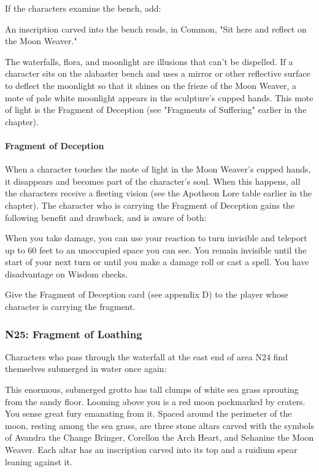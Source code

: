 \documentclass[10pt,a4,twoside,twocolumn,openany,nodeprecatedcode]{dndbook}
\begin{document}
If the characters examine the bench, add:
\begin{DndReadAloud}{}
An inscription carved into the bench reads, in Common, "Sit here and reflect on the Moon Weaver."
\end{DndReadAloud}

The waterfalls, flora, and moonlight are illusions that can't be dispelled. If a character sits on the alabaster bench and uses a mirror or other reflective surface to deflect the moonlight so that it shines on the frieze of the Moon Weaver, a mote of pale white moonlight appears in the sculpture's cupped hands. This mote of light is the Fragment of Deception (see "Fragments of Suffering" earlier in the chapter).
\paragraph{Fragment of Deception}
When a character touches the mote of light in the Moon Weaver's cupped hands, it disappears and becomes part of the character's soul. When this happens, all the characters receive a fleeting vision (see the Apotheon Lore table earlier in the chapter).
The character who is carrying the Fragment of Deception gains the following benefit and drawback, and is aware of both:
\begin{DndComment}{}
{{When you take damage, you can use your reaction to turn invisible and teleport up to 60 feet to an unoccupied space you can see. You remain invisible until the start of your next turn or until you make a damage roll or cast a spell.}}
{{You have disadvantage on Wisdom checks.}}
\end{DndComment}

Give the Fragment of Deception card (see appendix D) to the player whose character is carrying the fragment.
\subsubsection{N25: Fragment of Loathing}
Characters who pass through the waterfall at the east end of area N24 find themselves submerged in water once again:
\begin{DndReadAloud}{}
This enormous, submerged grotto has tall clumps of white sea grass sprouting from the sandy floor. Looming above you is a red moon pockmarked by craters. You sense great fury emanating from it.
Spaced around the perimeter of the moon, resting among the sea grass, are three stone altars carved with the symbols of Avandra the Change Bringer, Corellon the Arch Heart, and Sehanine the Moon Weaver. Each altar has an inscription carved into its top and a ruidium spear leaning against it.
\end{DndReadAloud}
\end{document}
